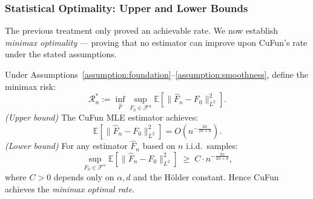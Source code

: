 \subsubsection{Statistical Optimality: Upper and Lower Bounds}

The previous treatment only proved an achievable rate.
We now establish \emph{minimax optimality} — proving that no estimator
can improve upon CuFun's rate under the stated assumptions.

\begin{theorem}
\label{thm:consistency_rate}
Under Assumptions~\ref{assumption:foundation}--\ref{assumption:smoothness},
define the minimax risk:
\[
\mathcal{R}_n^* := \inf_{\hat{F}} \sup_{F_0 \in \mathcal{F}^\alpha}
\mathbb{E}\!\left[\|\hat{F}_n - F_0\|_{L^2}^2\right].
\]
\emph{(Upper bound)} The CuFun MLE estimator achieves:
\[
\mathbb{E}\!\left[\|\hat{F}_n - F_0\|_{L^2}^2\right] = O\!\left(n^{-\frac{2\alpha}{2\alpha+d}}\right).
\]
\emph{(Lower bound)} For any estimator $\hat{F}_n$ based on $n$ i.i.d.\ samples:
\[
\sup_{F_0 \in \mathcal{F}^\alpha}
\mathbb{E}\!\left[\|\hat{F}_n - F_0\|_{L^2}^2\right]
\;\geq\; C \cdot n^{-\frac{2\alpha}{2\alpha+d}},
\]
where $C > 0$ depends only on $\alpha, d$ and the Hölder constant.
Hence CuFun achieves the \emph{minimax optimal rate}.
\end{theorem}

